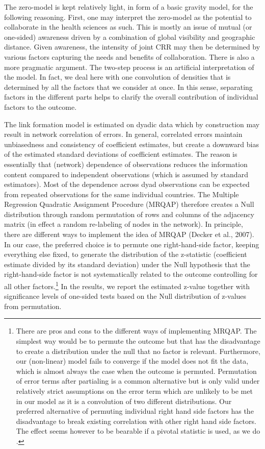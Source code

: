 The zero-model is kept relatively light, in form of a basic gravity model, for the following reasoning. First, one may interpret the zero-model as the potential to collaborate in the health sciences as such. This is mostly an issue of mutual (or one-sided) awareness driven by a combination of global visibility and geographic distance. Given awareness, the intensity of joint CRR may then be determined by various factors capturing the needs and benefits of collaboration. There is also a more pragmatic argument. The two-step process is an artificial interpretation of the model. In fact, we deal here with one convolution of densities that is determined by all the factors that we consider at once. In this sense, separating factors in the different parts helps to clarify the overall contribution of individual factors to the outcome.  

The link formation model is estimated on dyadic data which by construction may result in network correlation of errors. In general, correlated errors maintain unbiasedness and consistency of coefficient estimates, but create a downward bias of the estimated standard deviations of coefficient estimates. The reason is essentially that (network) dependence of observations reduces the information content compared to independent observations (which is assumed by standard estimators). Most of the dependence across dyad observations can be expected from repeated observations for the same individual countries. The Multiple Regression Quadratic Assignment Procedure (MRQAP) therefore creates a Null distribution through random permutation of rows and columns of the adjacency matrix (in effect a random re-labeling of nodes in the network). In principle, there are different ways to implement the idea of MRQAP (Decker et al., 2007). In our case, the preferred choice is to permute one right-hand-side factor, keeping everything else fixed, to generate the distribution of the z-statistic (coefficient estimate divided by its standard deviation) under the Null hypothesis that the right-hand-side factor is not systematically related to the outcome controlling for all other factors.\footnote{There are pros and cons to the different ways of implementing MRQAP. The simplest way would be to permute the outcome but that has the disadvantage to create a distribution under the null that no factor is relevant. Furthermore, our (non-linear) model fails to converge if the model does not fit the data, which is almost always the case when the outcome is permuted. Permutation of error terms after partialing is a common alternative but is only valid under relatively strict assumptions on the error term which are unlikely to be met in our model as it is a convolution of two different distributions. Our preferred alternative of permuting individual right hand side factors has the disadvantage to break existing correlation with other right hand side factors. The effect seems however to be bearable if a pivotal statistic is used, as we do \citep{dekker2007sensitivity}.} In the results, we report the estimated z-value together with significance levels of one-sided tests based on the Null distribution of z-values from permutation.  

